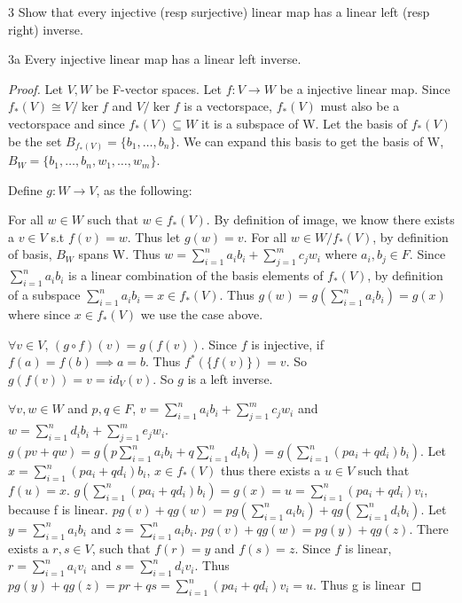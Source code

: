 \documentclass{article}
\newcommand{\rarr}[0]{\rightarrow}
\begin{document}
\bigskip

\begin{PROB}{3}\label{Problem 3.}
	Show that every injective (resp surjective) linear map has a linear left (resp right) inverse.
\end{PROB}
\begin{claim}{3a}
	Every injective linear map has a linear left inverse.
\end{claim}
\begin{proof}
	Let $V, W$ be F-vector spaces. Let $f: V \rarr W$ be a injective linear map. Since $f_*(V) \cong V/\ker{f}$ and $V/\ker{f}$ is a vectorspace, $f_*(V)$ must also be a vectorspace and since $f_*(V) \subseteq W$ it is a subspace of W. Let the basis of $f_*(V)$ be the set $B_{f_*(V)} = \{b_1, \ldots, b_n\}$. We can expand this basis to get the basis of W, $B_W = \{b_1, \ldots, b_n, w_1, \ldots, w_m\}$.

	Define $g: W \rarr V$, as the following: 
	
	For all $w \in W$ such that $w \in f_*(V)$. By definition of image, we know there exists a $v \in V$ s.t $f(v) = w$. Thus let $g(w) = v$. For all $w \in W / f_*(V)$, by definition of basis, $B_W$ spans W. Thus $w = \sum_{i=1}^{n}a_ib_i + \sum_{j=1}^{m}c_jw_i$ where $a_i, b_j \in F$. Since $\sum_{i=1}^{n}a_ib_i$ is a linear combination of the basis elements of $f_*(V)$, by definition of a subspace $\sum_{i=1}^{n}a_ib_i = x \in f_*(V)$. Thus $g(w) = g(\sum_{i=1}^{n}a_ib_i) = g(x)$ where since $x \in f_*(V)$ we use the case above.

	$\forall v \in V$, $(g \circ f)(v) = g(f(v))$. Since $f$ is injective, if $f(a) = f(b) \implies a = b$. Thus $f^*(\{f(v)\}) = v$. So $g(f(v)) = v = id_V(v)$. So $g$ is a left inverse.

	$\forall v, w \in W$ and $p, q \in F$, $v = \sum_{i=1}^{n}a_ib_i + \sum_{j=1}^{m}c_jw_i$ and $w = \sum_{i=1}^{n}d_ib_i + \sum_{j=1}^{m}e_jw_i$. $g(pv+qw) = g(p\sum_{i=1}^{n}a_ib_i + q\sum_{i=1}^{n}d_ib_i) = g(\sum_{i=1}^{n}(pa_i + qd_i)b_i)$. Let $x = \sum_{i=1}^{n}(pa_i + qd_i)b_i$, $x \in f_*(V)$ thus there exists a $u \in V$ such that $f(u) = x$. $g(\sum_{i=1}^{n}(pa_i + qd_i)b_i) = g(x) = u = \sum_{i=1}^{n}(pa_i + qd_i)v_i$, because f is linear. $pg(v) + qg(w) = pg(\sum_{i=1}^{n}a_ib_i) + qg(\sum_{i=1}^{n}d_ib_i)$. Let $y = \sum_{i=1}^{n}a_ib_i$ and $z = \sum_{i=1}^{n}a_ib_i$. $pg(v) + qg(w) = pg(y) + qg(z)$. There exists a $r, s \in V$, such that $f(r) = y$ and $f(s) = z$. Since $f$ is linear, $r = \sum_{i=1}^{n}a_iv_i$ and $s = \sum_{i=1}^{n}d_iv_i$. Thus $pg(y) + qg(z) = pr + qs = \sum_{i=1}^{n}(pa_i + qd_i)v_i = u$. 
	Thus g is linear
\end{proof}
\end{document}
